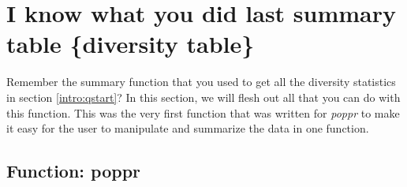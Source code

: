\documentclass[letterpaper]{article}\usepackage[]{graphicx}\usepackage[]{color}
\newcommand{\tab}{\hspace*{1em}}
\newcommand{\poppr}{\textit{poppr}}
\begin{document}
\section{I know what you did last summary table \{diversity table\}}
\label{summary}

\tab\tab Remember the summary function that you used to get all the diversity statistics in section \ref{intro:qstart}? In this section, we will flesh out all that you can do with this function. This was the very first function that was written for \poppr{} to make it easy for the user to manipulate and summarize the data in one function.
%
\subsection{Function: poppr}
\label{summary:poppr}
\end{document}
